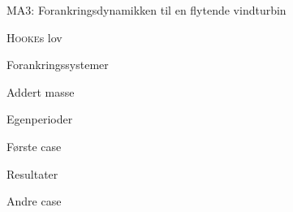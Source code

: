\documentclass[gray]{beamer}
\begin{document}
\begin{frame}{MA3: Forankringsdynamikken til en flytende vindturbin}
  
\end{frame}

\begin{frame}{\textsc{Hooke}s lov}
  
\end{frame}

\begin{frame}{Forankringssystemer}
  
\end{frame}

\begin{frame}{Addert masse}
  
\end{frame}

\begin{frame}{Egenperioder}
  
\end{frame}

\begin{frame}{Første case}
  
\end{frame}
\begin{frame}{Resultater}
  
\end{frame}

\begin{frame}{Andre case}
  
\end{frame}

\begin{frame}[allowframebreaks]
  \printbibliography
\end{frame}
\end{document}
